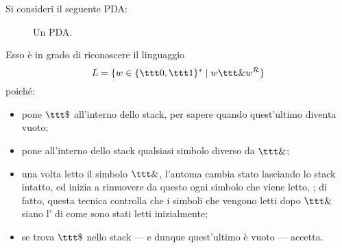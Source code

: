 \documentclass[a4paper, 12pt]{report}
\begin{document}
    \begin{example}[PDA]
        Si consideri il seguente PDA:

        \begin{figure}[H]
            \centering
             \caption{Un PDA.}
        \end{figure}

        Esso è in grado di riconoscere il linguaggio $$L=\{w \in \{\ttt 0, \ttt 1\}^* \mid w \ttt \& w ^\mathcal{R}\}$$ poiché:

        \begin{itemize}
            \item pone $\ttt \$$ all'interno dello stack, per sapere quando quest'ultimo diventa vuoto;
            \item pone all'interno dello stack qualsiasi simbolo diverso da $\ttt \&$;
            \item una volta letto il simbolo $\ttt \&$, l'automa cambia stato lasciando lo stack intatto, ed inizia a rimuovere da questo ogni simbolo che viene letto, ; di fatto, questa tecnica controlla che i simboli che vengono letti dopo $\ttt \&$ siano l' di come sono stati letti inizialmente;
            \item se trova $\ttt \$$ nello stack --- e dunque quest'ultimo è vuoto --- accetta.
        \end{itemize}
    \end{example}
\end{document}
